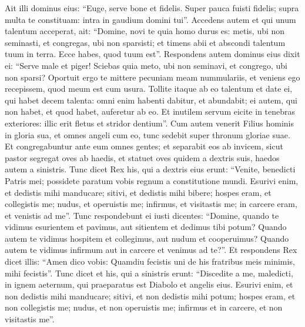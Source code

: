 \begin{biblechapter}
\begin{biblechapter}
\begin{biblechapter}
\begin{biblechapter}
\begin{biblechapter}
\begin{biblechapter}
\begin{biblechapter}
\begin{biblechapter}
\begin{biblechapter}
\begin{biblechapter}
\begin{biblechapter}
\begin{biblechapter}
\begin{biblechapter}
\begin{biblechapter}
\begin{biblechapter}
\begin{biblechapter}
\begin{biblechapter}
\begin{biblechapter}
\begin{biblechapter}
\begin{biblechapter}
\begin{biblechapter}
\begin{biblechapter}
\begin{biblechapter}
\begin{biblechapter}
\begin{biblechapter}
\verse Ait illi dominus eius: “Euge, serve bone et fidelis. Super pauca fuisti fidelis; supra multa te constituam: intra in gaudium domini tui”. 
\verse Accedens autem et qui unum talentum acceperat, ait: “Domine, novi te quia homo durus es: metis, ubi non seminasti, et congregas, ubi non sparsisti; 
\verse et timens abii et abscondi talentum tuum in terra. Ecce habes, quod tuum est”. 
\verse Respondens autem dominus eius dixit ei: “Serve male et piger! Sciebas quia meto, ubi non seminavi, et congrego, ubi non sparsi? 
\verse Oportuit ergo te mittere pecuniam meam nummulariis, et veniens ego recepissem, quod meum est cum usura. 
\verse Tollite itaque ab eo talentum et date ei, qui habet decem talenta: 
\verse omni enim habenti dabitur, et abundabit; ei autem, qui non habet, et quod habet, auferetur ab eo. 
\verse Et inutilem servum eicite in tenebras exteriores: illic erit fletus et stridor dentium”.
 \verse Cum autem venerit Filius hominis in gloria sua, et omnes angeli cum eo, tunc sedebit super thronum gloriae suae. 
\verse Et congregabuntur ante eum omnes gentes; et separabit eos ab invicem, sicut pastor segregat oves ab haedis, 
 \verse et statuet oves quidem a dextris suis, haedos autem a sinistris. 
\verse Tunc dicet Rex his, qui a dextris eius erunt: “Venite, benedicti Patris mei; possidete paratum vobis regnum a constitutione mundi. 
\verse Esurivi enim, et dedistis mihi manducare; sitivi, et dedistis mihi bibere; hospes eram, et collegistis me; 
\verse nudus, et operuistis me; infirmus, et visitastis me; in carcere eram, et venistis ad me”. 
\verse Tunc respondebunt ei iusti dicentes: “Domine, quando te vidimus esurientem et pavimus, aut sitientem et dedimus tibi potum? 
\verse Quando autem te vidimus hospitem et collegimus, aut nudum et cooperuimus? 
\verse Quando autem te vidimus infirmum aut in carcere et venimus ad te?”. 
\verse Et respondens Rex dicet illis: “Amen dico vobis: Quamdiu fecistis uni de his fratribus meis minimis, mihi fecistis”. 
\verse Tunc dicet et his, qui a sinistris erunt: “Discedite a me, maledicti, in ignem aeternum, qui praeparatus est Diabolo et angelis eius. 
\verse Esurivi enim, et non dedistis mihi manducare; sitivi, et non dedistis mihi potum; 
\verse hospes eram, et non collegistis me; nudus, et non operuistis me; infirmus et in carcere, et non visitastis me”. 

\end{biblechapter}
\end{biblechapter}
\end{biblechapter}
\end{biblechapter}
\end{biblechapter}
\end{biblechapter}
\end{biblechapter}
\end{biblechapter}
\end{biblechapter}
\end{biblechapter}
\end{biblechapter}
\end{biblechapter}
\end{biblechapter}
\end{biblechapter}
\end{biblechapter}
\end{biblechapter}
\end{biblechapter}
\end{biblechapter}
\end{biblechapter}
\end{biblechapter}
\end{biblechapter}
\end{biblechapter}
\end{biblechapter}
\end{biblechapter}
\end{biblechapter}
